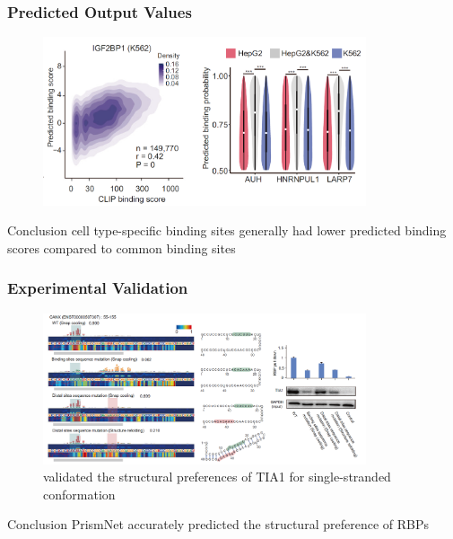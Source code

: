 \documentclass{ctexbeamer}
\begin{document}
\begin{frame}
  \frametitle{Predicted Output Values}
  \begin{figure}[H]
    \center
    \includegraphics[width=0.85\textwidth]{./figures/predict_out.png}
    \label{fig:predict_out}
  \end{figure}
  \begin{block}{Conclusion}
  cell type-specific binding sites generally had lower predicted binding scores compared to common binding sites
  \end{block}
\end{frame}

\begin{frame}
  \frametitle{Experimental Validation}
  \begin{figure}[H]
    \center
    \includegraphics[width=0.85\textwidth]{./figures/validation.png}
    \caption{validated the structural preferences
of TIA1 for single-stranded conformation}
    \label{fig:validation}
  \end{figure}
  \begin{block}{Conclusion}
  PrismNet accurately predicted the structural preference of RBPs
  \end{block}
\end{frame}
\end{document}
